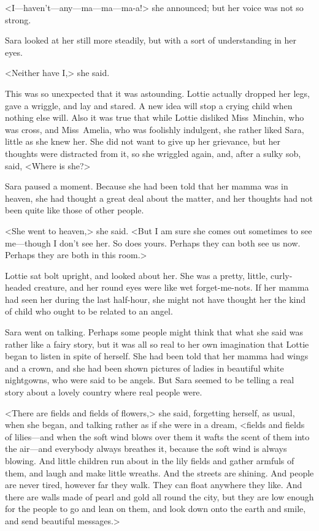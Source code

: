 <I—haven't—any—ma—ma—ma-a!> she announced; but her voice was not so strong.

Sara looked at her still more steadily, but with a sort of understanding in her eyes.

<Neither have I,> she said.

This was so unexpected that it was astounding. Lottie actually dropped her legs, gave a wriggle, and lay and stared. A new idea will stop a crying child when nothing else will. Also it was true that while Lottie disliked Miss~Minchin, who was cross, and Miss~Amelia, who was foolishly indulgent, she rather liked Sara, little as she knew her. She did not want to give up her grievance, but her thoughts were distracted from it, so she wriggled again, and, after a sulky sob, said, <Where is she?>

Sara paused a moment. Because she had been told that her mamma was in heaven, she had thought a great deal about the matter, and her thoughts had not been quite like those of other people.

<She went to heaven,> she said. <But I am sure she comes out sometimes to see me—though I don't see her. So does yours. Perhaps they can both see us now. Perhaps they are both in this room.>

Lottie sat bolt upright, and looked about her. She was a pretty, little, curly-headed creature, and her round eyes were like wet forget-me-nots. If her mamma had seen her during the last half-hour, she might not have thought her the kind of child who ought to be related to an angel.

Sara went on talking. Perhaps some people might think that what she said was rather like a fairy story, but it was all so real to her own imagination that Lottie began to listen in spite of herself. She had been told that her mamma had wings and a crown, and she had been shown pictures of ladies in beautiful white nightgowns, who were said to be angels. But Sara seemed to be telling a real story about a lovely country where real people were.

<There are fields and fields of flowers,> she said, forgetting herself, as usual, when she began, and talking rather as if she were in a dream, <fields and fields of lilies—and when the soft wind blows over them it wafts the scent of them into the air—and everybody always breathes it, because the soft wind is always blowing. And little children run about in the lily fields and gather armfuls of them, and laugh and make little wreaths. And the streets are shining. And people are never tired, however far they walk. They can float anywhere they like. And there are walls made of pearl and gold all round the city, but they are low enough for the people to go and lean on them, and look down onto the earth and smile, and send beautiful messages.>

